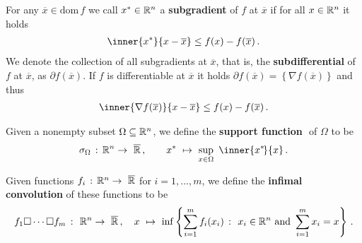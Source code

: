 For any $\overline{x}\in\mathrm{dom}\,f$ we call $x^*\in\mathbb{R}^n$ a 
\textbf{subgradient} of $f$ at $\overline{x}$ if for all 
$x\in\mathbb{R}^n$ it holds
\begin{gather}
  \inner{x^*}{x-\overline{x}}
  \le
  f(x)
  -
  f(\overline{x})
  \,.
\end{gather}
We denote the collection of all subgradients at $\overline{x}$, that is, the \textbf{subdifferential} of $f$ at $\overline{x}$, as
$
\partial f(\overline{x})
$.
If $f$ is differentiable at $\overline{x}$ it holds
$
\partial f(\overline{x})
=
\left\{ 
  \nabla
  f(\overline{x})
\right\}
$
and thus
\begin{gather}
  \label{cv:primer:mvthe}
  \inner{
  \nabla
  f(\overline{x})
}{x-\overline{x}}
  \le
  f(x)
  -
  f(\overline{x})
  \,.
\end{gather}
%

\begin{definition*}
  Given a nonempty subset 
  $\Omega \subseteq \mathbb{R}^n$,
  we define
  the \textbf{support function} 
  $
  $
  of $\Omega$
  to be
  \begin{gather*}
  \sigma_\Omega 
  \,
  :
  \,
  \R^n \to\  \overline{\R}
  \,,
  \qquad
  x^*
  \ 
  \mapsto
  \ 
    \sup_{x \in \Omega}
    \ 
    \inner{x^*\!}{x}
    \,.
  \end{gather*}
\end{definition*}


\begin{definition}
  Given functions
  $
    f_i\,:\,
    \mathbb{R}^n \to\  \overline{\mathbb{R}}
  $
  for $ i = 1, \ldots, m $,
  we define the \textbf{infimal convolution} of these functions to be
  \begin{gather*}
    f_1 \square \cdots \square f_m
    \ 
    \colon
    \ 
    \R^n
    \to
    \ 
    \overline{\R}
    \,,
    \quad
    x
    \ 
    \mapsto
    \ 
    \inf
    \left\{ 
    \sum_{i = 1}^{m}
      f_i(x_i)
      \ 
      \colon
      \ 
      x_i \in \R^n 
      \ 
      \mathrm{and}\ 
      \sum_{i = 1}^{m} 
        x_i
      =
      x
    \right\}
    \,.
  \end{gather*}
\end{definition}
 
